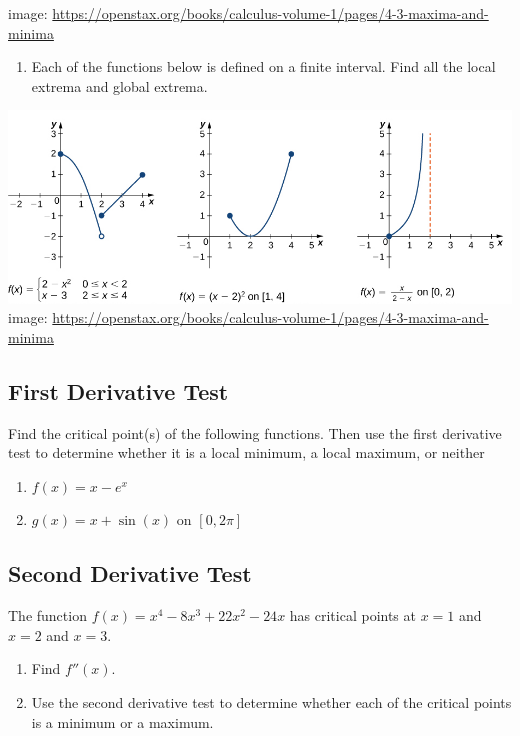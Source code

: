 \documentclass[
]{book}
\providecommand{\tightlist}{%
  \setlength{\itemsep}{0pt}\setlength{\parskip}{0pt}}
\begin{document}
image: \url{https://openstax.org/books/calculus-volume-1/pages/4-3-maxima-and-minima}

\begin{enumerate}
\def\labelenumi{\arabic{enumi}.}
\setcounter{enumi}{1}
\tightlist
\item
  Each of the functions below is defined on a finite interval. Find all the local extrema and global extrema.
\end{enumerate}

\includegraphics[width=1\textwidth,height=\textheight]{images/minmax-ex2.png}
image: \url{https://openstax.org/books/calculus-volume-1/pages/4-3-maxima-and-minima}

\hypertarget{first-derivative-test}{%
\subsection{First Derivative Test}\label{first-derivative-test}}

Find the critical point(s) of the following functions. Then use the first derivative test to determine whether it is a local minimum, a local maximum, or neither

\begin{enumerate}
\def\labelenumi{\arabic{enumi}.}
\tightlist
\item
  \(f(x) = x - e^x\)
\item
  \(g(x) = x + \sin(x)\) on \([0,2\pi]\)
\end{enumerate}

\hypertarget{second-derivative-test}{%
\subsection{Second Derivative Test}\label{second-derivative-test}}

The function \(f(x) = x^4-8 x^3+22 x^2-24 x\) has critical points at \(x=1\) and \(x=2\) and \(x=3\).

\begin{enumerate}
\def\labelenumi{\arabic{enumi}.}
\tightlist
\item
  Find \(f''(x)\).
\item
  Use the second derivative test to determine whether each of the critical points is a minimum or a maximum.
\end{enumerate}
\end{document}
